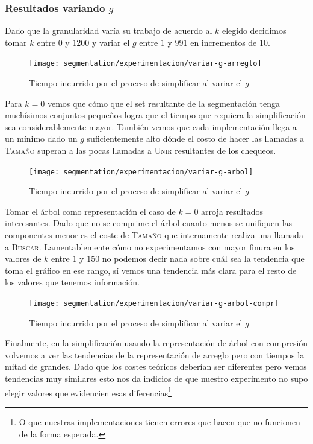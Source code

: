 \subsubsection{Resultados variando $g$}

Dado que la granularidad varía su trabajo de acuerdo al $k$ elegido decidimos
tomar $k$ entre $0$ y $1200$ y variar el $g$ entre $1$ y $991$ en incrementos
de $10$.

\begin{figure}[h]
	\centering
	\texttt{[image: segmentation/experimentacion/variar-g-arreglo]}
	\caption{Tiempo incurrido por el proceso de simplificar al variar el $g$}
\end{figure}

Para $k=0$ vemos que cómo que el set resultante de la segmentación tenga
muchísimos conjuntos pequeños logra que el tiempo que requiera la
simplificación sea considerablemente mayor. También vemos que cada
implementación llega a un mínimo dado un $g$ suficientemente alto dónde el
costo de hacer las llamadas a \textsc{Tamaño} superan a las pocas llamadas a
\textsc{Unir} resultantes de los chequeos.

\begin{figure}[h]
	\centering
	\texttt{[image: segmentation/experimentacion/variar-g-arbol]}
	\caption{Tiempo incurrido por el proceso de simplificar al variar el $g$}
\end{figure}

Tomar el árbol como representación el caso de $k=0$ arroja resultados
interesantes. Dado que no se comprime el árbol cuanto menos se unifiquen las
componentes menor es el coste de \textsc{Tamaño} que internamente realiza una
llamada a \textsc{Buscar}. Lamentablemente cómo no experimentamos con mayor
finura en los valores de $k$ entre $1$ y $150$ no podemos decir nada sobre cuál
sea la tendencia que toma el gráfico en ese rango, sí vemos una tendencia más
clara para el resto de los valores que tenemos información.

\clearpage

\begin{figure}[h]
	\centering
	\texttt{[image: segmentation/experimentacion/variar-g-arbol-compr]}
	\caption{Tiempo incurrido por el proceso de simplificar al variar el $g$}
\end{figure}

Finalmente, en la simplificación usando la representación de árbol con
compresión volvemos a ver las tendencias de la representación de arreglo pero
con tiempos la mitad de grandes. Dado que los costes teóricos deberían ser
diferentes pero vemos tendencias muy similares esto nos da indicios de que
nuestro experimento no supo elegir valores que evidencien esas
diferencias\footnote{O que nuestras implementaciones tienen errores que hacen
que no funcionen de la forma esperada.}

\clearpage

